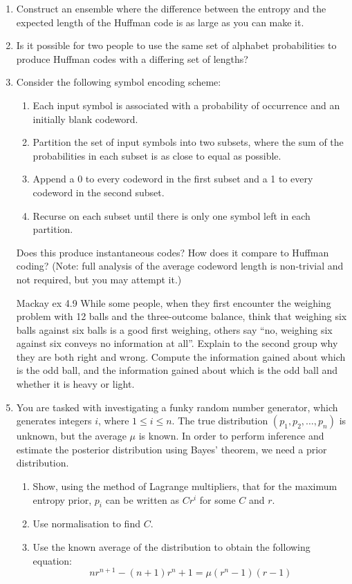 \documentclass[11pt,a4paper]{article}
\begin{document}
\begin{enumerate}
    \item Construct an ensemble where the difference between the entropy and the expected length of the Huffman code is as large as you can make it.

    \item Is it possible for two people to use the same set of alphabet probabilities to produce Huffman codes with a differing set of lengths?

    \item Consider the following symbol encoding scheme:
    \begin{enumerate}
        \item Each input symbol is associated with a probability of occurrence and an initially blank codeword.
        \item Partition the set of input symbols into two subsets, where the sum of the probabilities in each subset is as close to equal as possible.
        \item Append a 0 to every codeword in the first subset and a 1 to every codeword in the second subset.
        \item Recurse on each subset until there is only one symbol left in each partition.
    \end{enumerate}
    Does this produce instantaneous codes?  
    How does it compare to Huffman coding?  
    (Note: full analysis of the average codeword length is non-trivial and not required, but you may attempt it.)

    \item [Mackay ex 4.9] While some people, when they first encounter the weighing problem with 12 balls and the three-outcome balance, think that weighing six balls against six balls is a good first weighing, others say “no, weighing six against six conveys no information at all”.  
    Explain to the second group why they are both right and wrong.  
    Compute the information gained about which is the odd ball, and the information gained about which is the odd ball and whether it is heavy or light.

    \item You are tasked with investigating a funky random number generator, which generates integers $i$, where $1 \leq i \leq n$.  
    The true distribution $(p_1, p_2, \dots, p_n)$ is unknown, but the average $\mu$ is known.  
    In order to perform inference and estimate the posterior distribution using Bayes’ theorem, we need a prior distribution.
    \begin{enumerate}
        \item Show, using the method of Lagrange multipliers, that for the maximum entropy prior, $p_i$ can be written as $C r^i$ for some $C$ and $r$.
        \item Use normalisation to find $C$.
        \item Use the known average of the distribution to obtain the following equation:
        \[
        n r^{n+1} - (n+1) r^n + 1 = \mu (r^n - 1)(r-1)
        \]
    \end{enumerate}
\end{enumerate}
\end{document}
